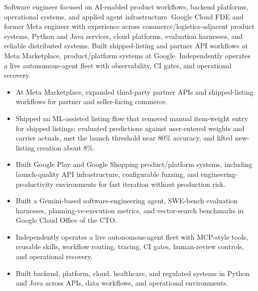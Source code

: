 


Software engineer focused on AI-enabled product workflows, backend platforms, operational systems, and applied agent infrastructure. Google Cloud FDE and former Meta engineer with experience across commerce/logistics-adjacent product systems, Python and Java services, cloud platforms, evaluation harnesses, and reliable distributed systems. Built shipped-listing and partner API workflows at Meta Marketplace, product/platform systems at Google. Independently operates a live autonomous-agent fleet with observability, CI gates, and operational recovery.
\begin{itemize}
  \item At Meta Marketplace, expanded third-party partner APIs and shipped-listing workflows for partner and seller-facing commerce.
  \item Shipped an ML-assisted listing flow that removed manual item-weight entry for shipped listings; evaluated predictions against user-entered weights and carrier actuals, met the launch threshold near 80\% accuracy, and lifted new-listing creation about 8\%.
  \item Built Google Play and Google Shopping product/platform systems, including launch-quality API infrastructure, configurable fuzzing, and engineering-productivity environments for fast iteration without production risk.
\end{itemize}
\begin{itemize}
  \item Built a Gemini-based software-engineering agent, SWE-bench evaluation harnesses, planning-vs-execution metrics, and vector-search benchmarks in Google Cloud Office of the CTO.
  \item Independently operates a live autonomous-agent fleet with MCP-style tools, reusable skills, workflow routing, tracing, CI gates, human-review controls, and operational recovery.
  \item Built backend, platform, cloud, healthcare, and regulated systems in Python and Java across APIs, data workflows, and operational environments.
\end{itemize}




